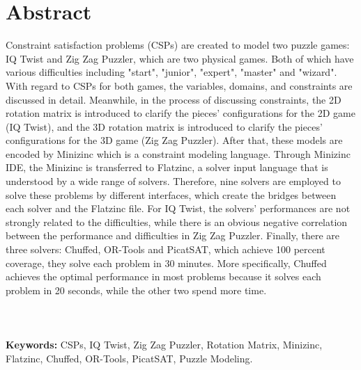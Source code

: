 \chapter*{Abstract}
\vspace{-1em}
Constraint satisfaction problems (CSPs) are created to model two puzzle games: IQ Twist and Zig Zag Puzzler, which are two physical games. Both of which have various difficulties including "start", "junior", "expert", "master" and "wizard". With regard to CSPs for both games, the variables, domains, and constraints are discussed in detail. Meanwhile, in the process of discussing constraints, the 2D rotation matrix is introduced to clarify the pieces' configurations for the 2D game (IQ Twist), and the 3D rotation matrix is introduced to clarify the pieces' configurations for the 3D game (Zig Zag Puzzler). After that, these models are encoded by Minizinc which is a constraint modeling language. Through Minizinc IDE, the Minizinc is transferred to Flatzinc, a solver input language that is understood by a wide range of solvers. Therefore, nine solvers are employed to solve these problems by different interfaces, which create the bridges between each solver and the Flatzinc file. For IQ Twist, the solvers' performances are not strongly related to the difficulties, while there is an obvious negative correlation between the performance and difficulties in Zig Zag Puzzler. Finally, there are three solvers: Chuffed, OR-Tools and PicatSAT, which achieve 100 percent coverage, they solve each problem in 30 minutes. More specifically, Chuffed achieves the optimal performance in most problems because it solves each problem in 20 seconds, while the other two spend more time.
\\
\\
\\
\\\textbf{Keywords:} CSPs, IQ Twist, Zig Zag Puzzler, Rotation Matrix, Minizinc, Flatzinc, Chuffed, OR-Tools, PicatSAT, Puzzle Modeling.


